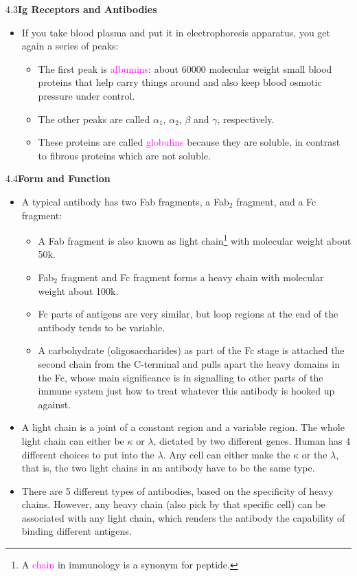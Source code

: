 \documentclass[UTF8]{book}
\newcommand{\pink}[1]{\textcolor{magenta}{#1}}
\begin{document}
4.3\quad \textbf{Ig Receptors and Antibodies}
\begin{itemize}
\item If you take blood plasma and put it in electrophoresis apparatus, you get again a series of peaks:
\begin{itemize}
	\item The first peak is \pink{albumins}: about 60000 molecular weight small blood proteins that help carry things around and also keep blood osmotic pressure under control.
	\item The other peaks are called $\alpha_1$, $\alpha_2$, $\beta$ and $\gamma$, respectively.
	\item These proteins are called \pink{globulins} because they are soluble, in contrast to fibrous proteins which are not soluble.
\end{itemize}
\end{itemize}
4.4\quad \textbf{Form and Function}
\begin{itemize}
\item A typical antibody has two Fab fragments, a Fab$_2$ fragment, and a Fc fragment:
\begin{itemize}
\item A Fab fragment is also known as light chain\footnote{A \pink{chain} in immunology is a synonym for peptide.} with molecular weight about 50k.
\item Fab$_2$ fragment and Fc fragment forms a heavy chain with molecular weight about 100k.
\item Fc parts of antigens are very similar, but loop regions at the end of the antibody tends to be variable.
\item A carbohydrate (oligosaccharides) as part of the Fc stage is attached the second chain from the C-terminal and pulls apart the heavy domains in the Fc, whose main significance is in signalling to other parts of the immune system just how to treat whatever this antibody is hooked up against.
\end{itemize}
\item A light chain is a joint of a constant region and a variable region. The whole light chain can either be $\kappa$ or $\lambda$, dictated by two different genes. Human has 4 different choices to put into the $\lambda$. Any cell can either make the $\kappa$ or the $\lambda$, that is, the two light chains in an antibody have to be the same type.
\item There are 5 different types of antibodies, based on the specificity of heavy chains. However, any heavy chain (also pick by that specific cell) can be associated with any light chain, which renders the antibody the capability of binding different antigens.
\end{itemize}
\end{document}
